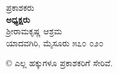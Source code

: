 \thispagestyle{empty}

\begin{center}
ಪ್ರಕಾಶಕರು\\\textbf{ಅಧ್ಯಕ್ಷರು}\\ಶ್ರೀರಾಮಕೃಷ್ಣ ಆಶ್ರಮ\\ಯಾದವಗಿರಿ, ಮೈಸೂರು ೫೭೦ ೦೨೦
\end{center}

\begin{center}
© ಎಲ್ಲ ಹಕ್ಕುಗಳೂ ಪ್ರಕಾಶಕರಿಗೆ ಸೇರಿವೆ.
\end{center}

